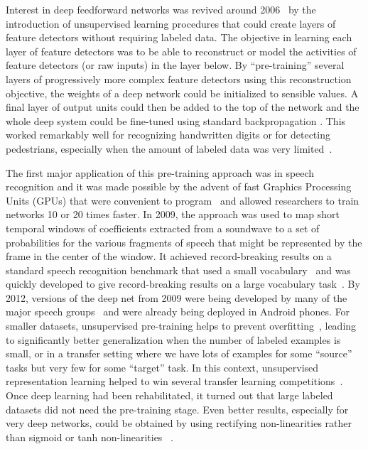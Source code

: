 \documentclass[10pts]{article}
\begin{document}
Interest in deep feedforward networks was revived around
2006~\citep{IJCAI,Hinton06-small,Bengio-nips-2006-small,ranzato-07-small}
by the introduction of unsupervised learning procedures that could
create layers of feature detectors without requiring labeled data. The
objective in learning each layer of feature detectors was to be able
to reconstruct or model the activities of feature detectors (or raw
inputs) in the layer below.  By ``pre-training'' several layers of
progressively more complex feature detectors using this reconstruction
objective, the weights of a deep network could be initialized to
sensible values.  A final layer of output units could then be added to
the top of the network and the whole deep system could be fine-tuned
using standard backpropagation
\citep{Hinton-Science2006,Bengio-nips-2006-small,ranzato-07-small}.
This worked remarkably well for recognizing handwritten digits or for
detecting pedestrians, especially when the amount of labeled data was
very limited~\citep{Erhan+al-2010-small,sermanet-cvpr-13}.

The first major application of this pre-training approach was in
speech recognition and it was made possible by the advent of fast
Graphics Processing Units (GPUs) that were convenient to
program~\citep{RainaICML09-small} and allowed researchers to train
networks 10 or 20 times faster.  In 2009, the approach was used to map
short temporal windows of coefficients extracted from a soundwave to a
set of probabilities for the various fragments of speech that might be
represented by the frame in the center of the window.  It achieved
record-breaking results on a standard speech recognition benchmark
that used a small vocabulary~\citep{TIMITpaper} and was quickly
developed to give record-breaking results on a large vocabulary
task~\citep{Dahl2012}.  By 2012, versions of the deep net from 2009
were being developed by many of the major speech
groups~\citep{Hinton-et-al-2012} and were already being deployed in
Android phones.  For smaller datasets, unsupervised pre-training helps
to prevent overfitting~\citep{Erhan+al-2010-small}, leading to
significantly better generalization when the number of labeled
examples is small, or in a transfer setting where we have lots of
examples for some ``source'' tasks but very few for some ``target''
task. In this context, unsupervised representation learning helped to
win several transfer learning
competitions~\citep{UTLC+LISA-2011-small,Goodfellow-icml2012}.  Once
deep learning had been rehabilitated, it turned out that large labeled
datasets did not need the pre-training stage. Even better results,
especially for very deep networks, could be obtained by using
rectifying non-linearities rather than sigmoid or tanh non-linearities
~\citep{Nair-2010-small,Glorot+al-AI-2011-small,Krizhevsky-2012-small,Dahl-et-al-ICASSP2013}.
\end{document}
